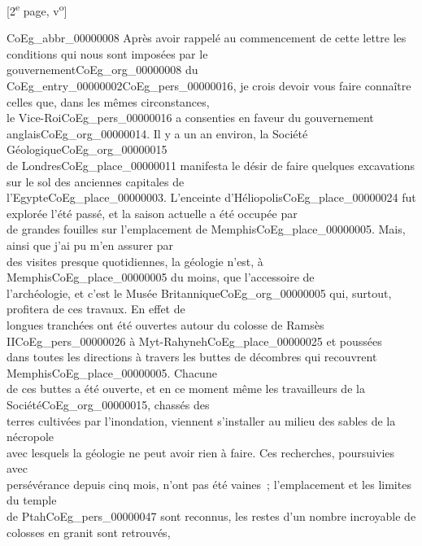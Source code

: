 \documentclass{book}
\begin{document}
{\footnotesize\begin{center} {[2\textsuperscript{e} page, v\textsuperscript{o}]}\end{center}
\noindent \gls{CoEg_abbr_00000008} Après avoir rappelé au commencement de cette lettre les conditions qui nous sont imposées par le\\
gouvernement\gls{CoEg_org_00000008} du \gls{CoEg_entry_00000002}\gls{CoEg_pers_00000016}, je crois devoir vous faire connaître celles que, dans les mêmes circonstances,\\
le Vice-Roi\gls{CoEg_pers_00000016} a consenties en faveur du gouvernement anglais\gls{CoEg_org_00000014}. Il y a un an environ, la Société Géologique\gls{CoEg_org_00000015}\\
de Londres\gls{CoEg_place_00000011} manifesta le désir de faire quelques excavations sur le sol des anciennes capitales de\\
l’Egypte\gls{CoEg_place_00000003}. L’enceinte d’Héliopolis\gls{CoEg_place_00000024} fut explorée l’été passé, et la saison actuelle a été occupée par\\
de grandes fouilles sur l’emplacement de Memphis\gls{CoEg_place_00000005}. Mais, ainsi que j’ai pu m’en assurer par\\
des visites presque quotidiennes, la géologie n’est, à Memphis\gls{CoEg_place_00000005} du moins, que l’accessoire de\\
l’archéologie, et c’est le Musée Britannique\gls{CoEg_org_00000005} qui, surtout, profitera de ces travaux. En effet de\\
longues tranchées ont été ouvertes autour du colosse de Ramsès II\gls{CoEg_pers_00000026} à Myt-Rahyneh\gls{CoEg_place_00000025} et poussées\\
dans toutes les directions à travers les buttes de décombres qui recouvrent Memphis\gls{CoEg_place_00000005}. Chacune\\
de ces buttes a été ouverte, et en ce moment même les travailleurs de la Société\gls{CoEg_org_00000015}, chassés des\\
terres cultivées par l’inondation, viennent s’installer au milieu des sables de la nécropole\\
avec lesquels la géologie ne peut avoir rien à faire. Ces recherches, poursuivies avec\\
persévérance depuis cinq mois, n’ont pas été vaines~; l’emplacement et les limites du temple\\
de Ptah\gls{CoEg_pers_00000047} sont reconnus, les restes d’un nombre incroyable de colosses en granit sont retrouvés,\\
}
\end{document}
